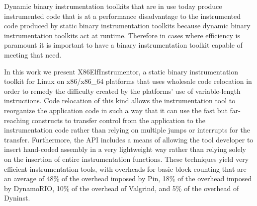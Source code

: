 \begin{it}
Dynamic binary instrumentation toolkits that are in use today
produce instrumented code that is at a performance disadvantage to the instrumented code
produced by static binary instrumentation toolkits because dynamic binary instrumentation toolkits 
act at runtime. Therefore in cases where efficiency is paramount it is important to have a
binary instrumentation toolkit capable of meeting that need.

In this work we present X86ElfInstrumentor, a static binary instrumentation
toolkit for Linux on x86/x86\_64 platforms that uses wholesale
code relocation in order to remedy the difficulty created by the platforms' use
of variable-length instructions. Code relocation of this kind allows the
instrumentation tool to reorganize the application code in such a way that it
can use the fast but far-reaching constructs to transfer control
from the application to the instrumentation code rather than relying on multiple
jumps or interrupts for the transfer. Furthermore, the API includes a means of
allowing the tool developer to insert hand-coded assembly in a very lightweight
way rather than relying solely on the insertion of entire instrumentation functions.
These techniques yield very efficient instrumentation tools, with overheads 
for basic block counting that are an
average of 48\% of the overhead imposed by Pin, 18\% of the overhead imposed by
DynamoRIO, 10\% of the overhead of Valgrind, and 5\% of the overhead of Dyninst.
\end{it}
